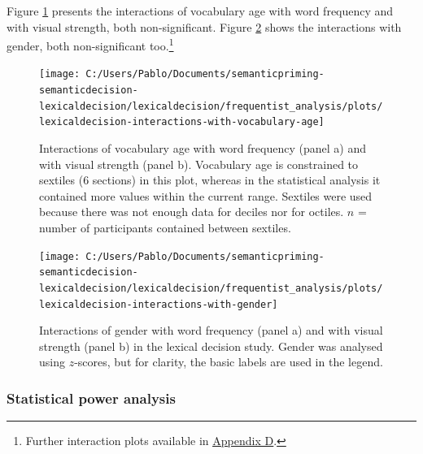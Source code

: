 \documentclass[
  12pt,
  man,floatsintext]{apa7}
\begin{document}
Figure \ref{fig:lexicaldecision-interactions-with-vocabulary-age} presents the interactions of vocabulary age with word frequency and with visual strength, both non-significant. Figure \ref{fig:lexicaldecision-interactions-with-gender} shows the interactions with gender, both non-significant too.\footnote{Further interaction plots available in \protect\hyperlink{appendix-D-interaction-plots}{\underline{Appendix D}}.}



\begin{figure}

{\centering \texttt{[image: C:/Users/Pablo/Documents/semanticpriming-semanticdecision-lexicaldecision/lexicaldecision/frequentist\_analysis/plots/lexicaldecision-interactions-with-vocabulary-age]} 

}

\caption{Interactions of vocabulary age with word frequency (panel a) and with visual strength (panel b). Vocabulary age is constrained to sextiles (6 sections) in this plot, whereas in the statistical analysis it contained more values within the current range. Sextiles were used because there was not enough data for deciles nor for octiles. \(n\) = number of participants contained between sextiles.}\label{fig:lexicaldecision-interactions-with-vocabulary-age}
\end{figure}

\begin{figure}

{\centering \texttt{[image: C:/Users/Pablo/Documents/semanticpriming-semanticdecision-lexicaldecision/lexicaldecision/frequentist\_analysis/plots/lexicaldecision-interactions-with-gender]} 

}

\caption{Interactions of gender with word frequency (panel a) and with visual strength (panel b) in the lexical decision study. Gender was analysed using $z$-scores, but for clarity, the basic labels are used in the legend.}\label{fig:lexicaldecision-interactions-with-gender}
\end{figure}

\hypertarget{statistical-power-analysis-6}{%
\subsubsection{Statistical power analysis}\label{statistical-power-analysis-6}}
\end{document}

